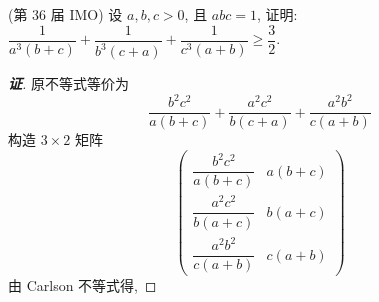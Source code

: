 \begin{example}
    (第 36 届 IMO) 设 $a,b,c>0$, 且 $abc=1$, 证明: $\dfrac{1}{a^3(b+c)}+\dfrac{1}{b^3(c+a)}+\dfrac{1}{c^3(a+b)}\geqslant\dfrac{3}{2}.$
\end{example}
\begin{proof}[{\songti \textbf{证}}]
    原不等式等价为 $$\dfrac{b^2c^2}{a(b+c)}+\dfrac{a^2c^2}{b(c+a)}+\dfrac{a^2b^2}{c(a+b)}$$
    构造 $3\times 2$ 矩阵
    $$\begin{pmatrix}
            \dfrac{b^2c^2}{a(b+c)} & a(b+c) \\[6pt]
            \dfrac{a^2c^2}{b(a+c)} & b(a+c) \\[6pt]
            \dfrac{a^2b^2}{c(a+b)} & c(a+b)
        \end{pmatrix}$$
    由 Carlson 不等式得, 
\end{proof}